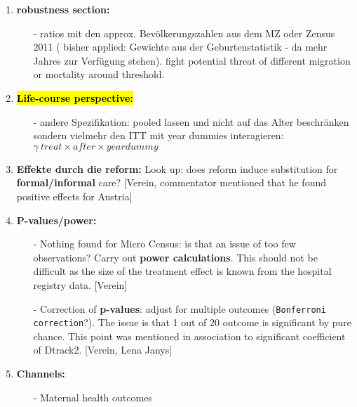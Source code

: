 \documentclass[11pt,a4paper]{article}
\begin{document}
{\begin{enumerate}
\item \textbf{robustness section:}\vspace{-1em}
\begin{itemize}
	\item[-] ratios mit den approx. Bevölkerungszahlen aus dem MZ oder Zensus 2011 ( bisher applied: Gewichte aus der Geburtenstatistik - da mehr Jahres zur Verfügung stehen). fight potential threat of different migration or mortality around threshold. 
\end{itemize}


\item \textbf{\hl{Life-course perspective:}}\vspace{-1em}
\begin{itemize}
	\item[-]andere Spezifikation: pooled lassen und nicht auf das Alter beschränken sondern 	vielmehr den ITT mit year dummies interagieren: \newline
	$\gamma\  treat \times after \times yeardummy$
\end{itemize}


\item \textbf{Effekte durch die reform:}\newline
Look up: does reform induce substitution for \textbf{formal/informal} care? [Verein, commentator mentioned that he found positive effects for Austria] 


\item \textbf{P-values/power:}\vspace{-1em}
\begin{itemize}
	\item[-] Nothing found for Micro Census: is that an issue of too few observations? Carry out \textbf{power calculations}. This should not be difficult as the size of the treatment effect is known from the hospital registry data. [Verein]
	\item[-] Correction of \textbf{p-values}: adjust for multiple outcomes (\texttt{Bonferroni correction}?). The issue is that 1 out of 20 outcome is significant by pure chance. This point was mentioned in association to significant coefficient of Dtrack2. [Verein, Lena Janys]
\end{itemize}


\item \textbf{Channels:}\vspace{-1em}
\begin{itemize}
	\item[-] Maternal health outcomes
\end{itemize}



\end{enumerate}}
\end{document}
